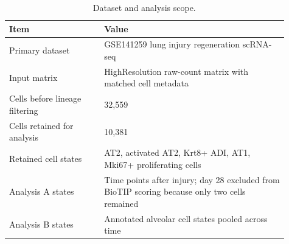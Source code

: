 \begin{table}[H]
\centering
\caption{Dataset and analysis scope.}
\label{tab:dataset-summary}
\begin{tabular}{p{0.31\linewidth}p{0.60\linewidth}}
\toprule
Item & Value
\\
\midrule
Primary dataset & GSE141259 lung injury regeneration scRNA-seq\\
Input matrix & HighResolution raw-count matrix with matched cell metadata\\
Cells before lineage filtering & 32,559\\
Cells retained for analysis & 10,381\\
Retained cell states & AT2, activated AT2, Krt8+ ADI, AT1, Mki67+ proliferating cells\\
Analysis A states & Time points after injury; day 28 excluded from BioTIP scoring because only two cells remained\\
Analysis B states & Annotated alveolar cell states pooled across time\\
\bottomrule
\end{tabular}
\end{table}
